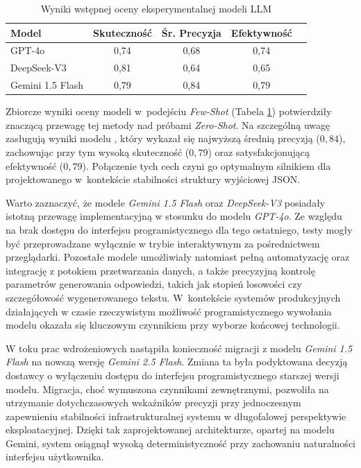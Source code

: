 \begin{table}[h!]
\centering
\caption{Wyniki wstępnej oceny eksperymentalnej modeli LLM}
\label{tab:llm_few_shot}
\begin{tabular}{|l|c|c|c|c|}
\hline
\textbf{Model} & \textbf{Skuteczność} & \textbf{Śr. Precyzja} & \textbf{Efektywność} \\ \hline
GPT-4o         & 0,74                 & 0,68                  & 0,74                 \\ \hline
DeepSeek-V3    & 0,81                 & 0,64                  & 0,65                 \\ \hline
Gemini 1.5 Flash & 0,79               & 0,84                  & 0,79                 \\ \hline
\end{tabular}
\end{table}

Zbiorcze wyniki oceny modeli w~podejściu \textit{Few-Shot} (Tabela \ref{tab:llm_few_shot}) potwierdziły znaczącą przewagę tej metody nad próbami \textit{Zero-Shot}. Na szczególną uwagę zasługują wyniki modelu , który wykazał się najwyższą średnią precyzją ($0,84$), zachowując przy tym wysoką skuteczność ($0,79$) oraz satysfakcjonującą efektywność ($0,79$). Połączenie tych cech czyni go optymalnym silnikiem dla projektowanego  w~kontekście stabilności struktury wyjściowej JSON.

Warto zaznaczyć, że modele \textit{Gemini 1.5 Flash} oraz \textit{DeepSeek-V3} posiadały istotną przewagę implementacyjną w stosunku do modelu \textit{GPT-4o}. Ze względu na brak dostępu do interfejsu programistycznego dla tego ostatniego, testy mogły być przeprowadzane wyłącznie w trybie interaktywnym za pośrednictwem przeglądarki. Pozostałe modele umożliwiały natomiast pełną automatyzację oraz integrację z potokiem przetwarzania danych, a także precyzyjną kontrolę parametrów generowania odpowiedzi, takich jak stopień losowości czy szczegółowość wygenerowanego tekstu. W~kontekście systemów produkcyjnych działających w czasie rzeczywistym możliwość programistycznego wywołania modelu okazała się kluczowym czynnikiem przy wyborze końcowej technologii.

W toku prac wdrożeniowych nastąpiła konieczność migracji z modelu \textit{Gemini 1.5 Flash} na nowszą wersję \textit{Gemini 2.5 Flash}. Zmiana ta była podyktowana decyzją dostawcy o wyłączeniu dostępu do interfejsu programistycznego starszej wersji modelu. Migracja, choć wymuszona czynnikami zewnętrznymi, pozwoliła na utrzymanie dotychczasowych wskaźników precyzji przy jednoczesnym zapewnieniu stabilności infrastrukturalnej systemu w długofalowej perspektywie eksploatacyjnej. Dzięki tak zaprojektowanej architekturze, opartej na modelu Gemini, system osiągnął wysoką deterministyczność przy zachowaniu naturalności interfejsu użytkownika.

